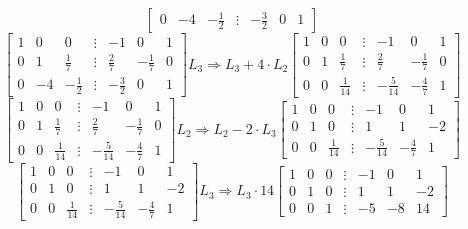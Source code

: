 \documentclass[12pt]{article}
\begin{document}
\begin{center}
$$\begin{bmatrix}
			0 & -4 & -\frac{1}{2} & \vdots & -\frac{3}{2} & 0 & 1
		\end{bmatrix}$$	
		$$\begin{bmatrix}
			1 & 0 & 0 & \vdots & -1 & 0 & 1 \\
			0 & 1 & \frac{1}{7} & \vdots & \frac{2}{7} & -\frac{1}{7} & 0 \\
			0 & -4 & -\frac{1}{2} & \vdots & -\frac{3}{2} & 0 & 1
		\end{bmatrix} L_3 \Rightarrow L_3+4\cdot L_2 \begin{bmatrix}
			1 & 0 & 0 & \vdots & -1 & 0 & 1 \\
			0 & 1 & \frac{1}{7} & \vdots & \frac{2}{7} & -\frac{1}{7} & 0 \\
			0 & 0 & \frac{1}{14} & \vdots & -\frac{5}{14} & -\frac{4}{7} & 1
		\end{bmatrix}$$	
		$$\begin{bmatrix}
			1 & 0 & 0 & \vdots & -1 & 0 & 1 \\
			0 & 1 & \frac{1}{7} & \vdots & \frac{2}{7} & -\frac{1}{7} & 0 \\
			0 & 0 & \frac{1}{14} & \vdots & -\frac{5}{14} & -\frac{4}{7} & 1
		\end{bmatrix} L_2 \Rightarrow L_2-2\cdot L_3 \begin{bmatrix}
			1 & 0 & 0 & \vdots & -1 & 0 & 1 \\
			0 & 1 & 0 & \vdots & 1 & 1 & -2 \\
			0 & 0 & \frac{1}{14} & \vdots & -\frac{5}{14} & -\frac{4}{7} & 1
		\end{bmatrix}$$	
		$$\begin{bmatrix}
			1 & 0 & 0 & \vdots & -1 & 0 & 1 \\
			0 & 1 & 0 & \vdots & 1 & 1 & -2 \\
			0 & 0 & \frac{1}{14} & \vdots & -\frac{5}{14} & -\frac{4}{7} & 1
		\end{bmatrix} L_3 \Rightarrow L_3\cdot 14 \begin{bmatrix}
			1 & 0 & 0 & \vdots & -1 & 0 & 1 \\
			0 & 1 & 0 & \vdots & 1 & 1 & -2 \\
			0 & 0 & 1 & \vdots & -5 & -8 & 14
		\end{bmatrix}$$	
		

\end{center}
\end{document}
